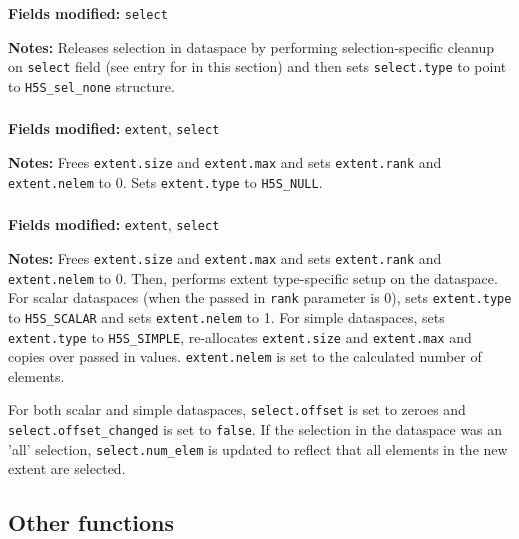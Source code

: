 \documentclass[../HDF5_RFC.tex]{subfiles}
\begin{document}
\subsubsection{}

\textbf{Fields modified:} \texttt{select}

\textbf{Notes:} Releases selection in dataspace by performing selection-specific cleanup on
\texttt{select} field (see entry for  in this section) and then
sets \texttt{select.type} to point to \texttt{H5S\_sel\_none} structure.

\subsubsection{}

\textbf{Fields modified:} \texttt{extent}, \texttt{select}

\textbf{Notes:} Frees \texttt{extent.size} and \texttt{extent.max} and sets \texttt{extent.rank} and \texttt{extent.nelem} to 0. Sets \texttt{extent.type} to \texttt{H5S\_NULL}.

\subsubsection{}

\textbf{Fields modified:} \texttt{extent}, \texttt{select}

\textbf{Notes:} Frees \texttt{extent.size} and \texttt{extent.max} and sets \texttt{extent.rank} and \texttt{extent.nelem} to 0. Then, performs extent type-specific setup on the dataspace. For scalar
dataspaces (when the passed in \texttt{rank} parameter is 0), sets \texttt{extent.type} to
\texttt{H5S\_SCALAR} and sets \texttt{extent.nelem} to 1. For simple dataspaces, sets \texttt{extent.type}
to \texttt{H5S\_SIMPLE}, re-allocates \texttt{extent.size} and \texttt{extent.max} and copies over
passed in values. \texttt{extent.nelem} is set to the calculated number of elements.

For both scalar and simple dataspaces, \texttt{select.offset} is set to zeroes and
\texttt{select.offset\_changed} is set to \texttt{false}. If the selection in the dataspace was an
'all' selection, \texttt{select.num\_elem} is updated to reflect that all elements in the new extent
are selected.

\subsection{Other functions}
\end{document}
